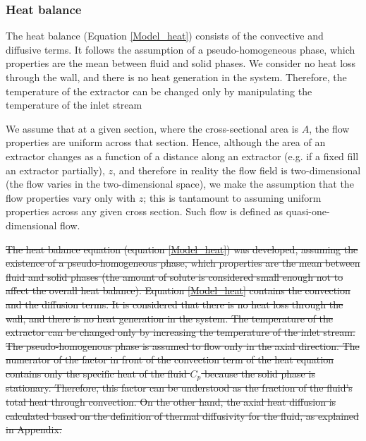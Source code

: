 \documentclass[../Article_Model_Parameters.tex]{subfiles}
\begin{document}
        
		
		\iffalse	
		\subsubsection{Heat balance} \label{CH: heat_balance}
		
		 {\color{black}
			The heat balance (Equation \ref{Model_heat}) consists of the convective and diffusive terms. It follows the assumption of a pseudo-homogeneous phase, which properties are the mean between fluid and solid phases. We consider no heat loss through the wall, and there is no heat generation in the system. Therefore, the temperature of the extractor can be changed only by manipulating the temperature of the inlet stream %
			
			We assume that at a given section, where the cross-sectional area is $A$, the flow properties are uniform across that section. Hence, although the area of an extractor changes  as a function of a distance along an extractor (e.g. if a fixed fill an extractor partially), $z$, and therefore in reality the flow field is two-dimensional (the flow varies in the two-dimensional space), we make the assumption that the flow properties vary only with $z$; this is tantamount to assuming uniform properties across any given cross section. Such flow is defined as quasi-one-dimensional flow.
			
		}
		
		\sout{The heat balance equation (equation  \ref{Model_heat}) was developed, assuming the existence of a pseudo-homogeneous phase, which properties are the mean between fluid and solid phases (the amount of solute is considered small enough not to affect the overall heat balance). Equation \ref{Model_heat} contains the convection and the diffusion terms. It is considered that there is no heat loss through the wall, and there is no heat generation in the system. The temperature of the extractor can be changed only by increasing the temperature of the inlet stream. The pseudo-homogenous phase is assumed to flow only in the axial direction. The numerator of the factor in front of the convection term of the heat equation contains only the specific heat of the fluid $C_p$ because the solid phase is stationary. Therefore, this factor can be understood as the fraction of the fluid's total heat through convection. On the other hand, the axial heat diffusion is calculated based on the definition of thermal diffusivity for the fluid, as explained in Appendix. }
			
\end{document}
